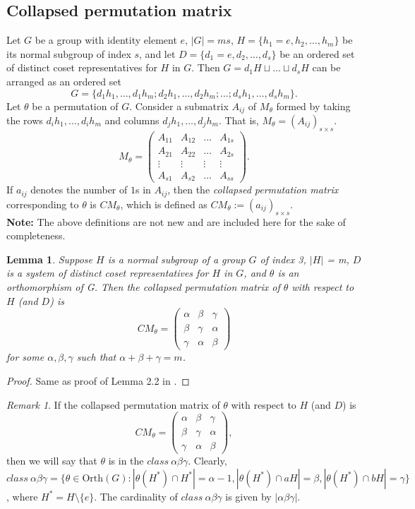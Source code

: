 \documentclass[11pt,a4paper]{article}
\newtheorem{lemma}[theorem]{Lemma}
\theoremstyle{definition}
\theoremstyle{remark}
\newtheorem{remark}{Remark}
\begin{document}
	\subsection{Collapsed permutation matrix}
	Let $G$ be a group with identity element $e$, $|G| = ms$, $H=\{h_{1} = e,h_{2},\ldots,h_{m}\}$ be its normal subgroup of index $s$, and let $D = \{d_{1}=e,d_{2}, \ldots, d_{s}\}$ be an ordered set of distinct coset representatives for $H$ in $G$. Then  $G = d_{1}H \sqcup \ldots \sqcup d_{s}H$ can be arranged as an ordered set $$G=\{d_{1}h_{1},\ldots,d_{1}h_{m};d_{2}h_{1},\ldots,d_{2}h_{m};\ldots;d_{s}h_{1},\ldots,d_{s}h_{m}\}.$$ Let $\theta$ be a permutation of $G$. Consider a submatrix $A_{ij}$ of $M_{\theta}$ formed  by taking the rows $d_{i}h_{1},\ldots, d_{i}h_{m}$ and columns $d_{j}h_{1},\ldots, d_{j}h_{m}$. That is, $M_{\theta} = (A_{ij})_{s \times s}$.
	\[M_\theta = \begin{pmatrix}
		A_{11}&A_{12}&\ldots&A_{1s}\\
		A_{21}&A_{22}&\ldots&A_{2s}\\
		\vdots&\vdots&\vdots&\vdots\\
		A_{s1}&A_{s2}&\ldots&A_{ss}
	\end{pmatrix}.\]
	 If $a_{ij}$ denotes the number of $1$s in $A_{ij}$, then  the \emph{collapsed permutation matrix} corresponding to $\theta$ is $CM_{\theta}$, which is defined as $CM_{\theta}:= (a_{ij})_{s \times s}.$\\[.2cm]
	 \textbf{Note:} The above definitions are not new and are included here for the sake of completeness.
	\begin{lemma}\label{le2}
		Suppose $H$ is a normal subgroup of a group $G$ of index 3, $\vert H \vert$ = m, $D$ is a system of distinct coset representatives for $H$ in $G$, and $\theta$ is an orthomorphism of G. Then the collapsed permutation matrix of $\theta$ with respect to $H$ (and $D$) is
		$$ CM_{\theta} = \begin{pmatrix}
			\alpha&\beta&\gamma\\\beta&\gamma&\alpha\\\gamma&\alpha&\beta
		\end{pmatrix}$$
		for some $\alpha, \beta, \gamma$ such that $\alpha+\beta+\gamma = m$.
	\end{lemma}
	\begin{proof}
		Same as proof of Lemma 2.2 in \cite{evans2}.
	\end{proof}
	\begin{remark}\label{re1}
		If the collapsed permutation matrix of $\theta$ with respect to $H$ (and $D$) is 
		$$ CM_{\theta} = \begin{pmatrix}
		\alpha&\beta&\gamma\\\beta&\gamma&\alpha\\\gamma&\alpha&\beta
	\end{pmatrix},$$
		then we will say that $\theta$ is in the $class~\alpha \beta \gamma$. Clearly,  $class~\alpha \beta \gamma = \{\theta \in \text{Orth}(G): |\theta(H^{\ast}) \cap H^{\ast}|= \alpha - 1,|\theta(H^{\ast}) \cap aH| = \beta, |\theta(H^{\ast}) \cap bH|= \gamma\}$,  where $H^{\ast} = H \setminus \{e\}.$ The cardinality of   $class~\alpha \beta \gamma$  is given by $|\alpha \beta \gamma|$.
	\end{remark}
\end{document}
